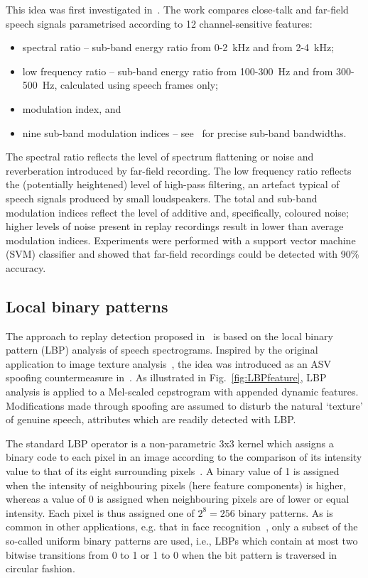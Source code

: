 This idea was first investigated in~\cite{Villalba2011}.  The work compares close-talk and far-field speech signals parametrised according to 12 channel-sensitive features:


\begin{itemize}
\item spectral ratio -- sub-band energy ratio from 0-2~kHz and from 2-4~kHz; 
\item low frequency ratio -- sub-band energy ratio from 100-300~Hz and from 300-500~Hz, calculated using speech frames only;
\item modulation index, and
\item nine sub-band modulation indices -- see~\cite{Villalba2011} for precise sub-band bandwidths.
\end{itemize}


The spectral ratio reflects the level of spectrum flattening or noise and reverberation introduced by far-field recording.  The low frequency ratio reflects the (potentially heightened) level of high-pass filtering, an artefact typical of speech signals produced by small loudspeakers.  The total and sub-band modulation indices reflect the level of additive and, specifically, coloured noise; higher levels of noise present in replay recordings result in lower than average modulation indices.  Experiments were performed with a support vector machine (SVM) classifier and showed that far-field recordings could be detected with 90\% accuracy.  %



\subsection{Local binary patterns}


The approach to replay detection proposed in~\cite{Alegre2014} is based on the local binary pattern (LBP) analysis of speech spectrograms.  
Inspired by the original application to image texture analysis~\cite{Ojala2002}, the idea was introduced as an ASV spoofing countermeasure in~\cite{Alegre2013a}.  
As illustrated in Fig.~\ref{fig:LBPfeature}, LBP analysis is applied to a Mel-scaled cepstrogram with appended dynamic features.  Modifications made through spoofing are assumed to disturb the natural `texture' of genuine speech, attributes which are readily detected with LBP.   

The standard LBP operator is a non-parametric 3x3 kernel which assigns a binary code to each pixel in an image according to the comparison of its intensity value to that of its eight surrounding pixels~\cite{Ojala2002}. 
A binary value of 1 is assigned when the intensity of neighbouring pixels (here feature components) is higher, whereas a value of 0 is assigned when neighbouring pixels are of lower or equal intensity. Each pixel is thus assigned one of $2^8=256$ binary patterns. As is common in other applications, e.g. that in face recognition~\cite{Ahonen2006}, only a subset of the so-called uniform binary patterns are used, i.e.,  LBPs which contain at most two bitwise transitions from 0 to 1 or 1 to 0 when the bit pattern is traversed in circular fashion.


